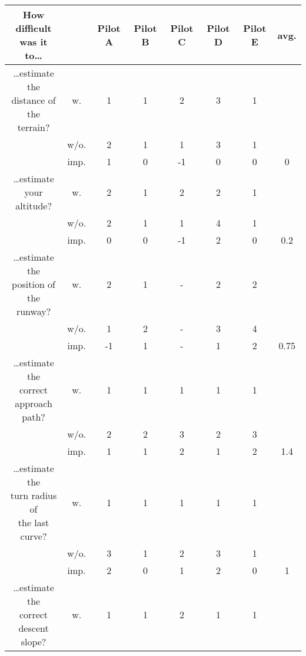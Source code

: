 \begin{table}
  \centering
  \begin{tabular}{c c c c c c c c} 
    \toprule
        \makecell{How difficult\\was it to\ldots} & & Pilot A & Pilot B & Pilot C & Pilot D & Pilot E & avg. \\
    \midrule
        \multirowcell{3}{\ldots estimate the\\distance of\\the terrain?} & w.   & 1 & 1 & 2 & 3 & 1 & \\
                            & w/o. & 2 & 1 & 1 & 3 & 1 & \\
                            & imp. & 1 & 0 & -1 & 0 & 0 & 0\\
    \midrule
        \multirowcell{3}{\ldots estimate\\your altitude?} & w.   & 2 & 1 & 2 & 2 & 1 & \\
                            & w/o. & 2 & 1 & 1 & 4 & 1 & \\
                            & imp. & 0 & 0 & -1 & 2 & 0 & 0.2\\
    \midrule
        \multirowcell{3}{\ldots estimate the\\position of\\the runway?} & w.   & 2 & 1 & - & 2 & 2 & \\
                            & w/o. & 1 & 2 & - & 3 & 4 & \\
                            & imp. & -1 & 1 & - & 1 & 2 & 0.75\\
    \midrule
        \multirowcell{3}{\ldots estimate the\\correct approach\\path?} & w.   & 1 & 1 & 1 & 1 & 1 & \\
                            & w/o. & 2 & 2 & 3 & 2 & 3 & \\
                            & imp. & 1 & 1 & 2 & 1 & 2 & 1.4\\
    \midrule
        \multirowcell{3}{\ldots estimate the\\turn radius of\\the last curve?} & w.   & 1 & 1 & 1 & 1 & 1 & \\
                            & w/o. & 3 & 1 & 2 & 3 & 1 & \\
                            & imp. & 2 & 0 & 1 & 2 & 0 & 1\\
    \midrule
        \multirowcell{3}{\ldots estimate the\\correct descent\\slope?} & w.   & 1 & 1 & 2 & 1 & 1 & \\

\end{tabular}
\end{table}
